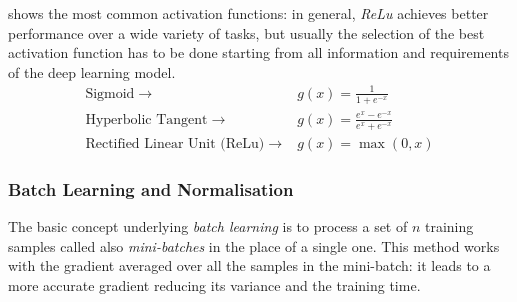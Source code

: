  shows the most common activation functions: in general, \textit{ReLu}  achieves better performance over a wide variety of tasks, but usually the selection of the best activation function has to be done starting from all information and requirements of the deep learning model.
\begin{equation}\label{eq:activation}
	\begin{aligned}
		\text{Sigmoid} \;\rightarrow\;                      & g(x) = \frac{1}{1+ e^{-x}}           \\
		\text{Hyperbolic Tangent} \;\rightarrow\;           & g(x) = \frac{e^x-e^{-x}}{e^x+e^{-x}} \\
		\text{Rectified Linear Unit (ReLu)} \;\rightarrow\; & g(x) = \max(0,x)
	\end{aligned}
\end{equation}

\subsubsection{Batch Learning and Normalisation}
The basic concept underlying \textit{batch learning} \cite{stanford2019cs231n} is to process a set of $n$ training samples called also \textit{mini-batches} in the place of a single one. This method works with the gradient averaged over all the samples in the mini-batch: it leads to a more accurate gradient reducing its variance and the training time.

